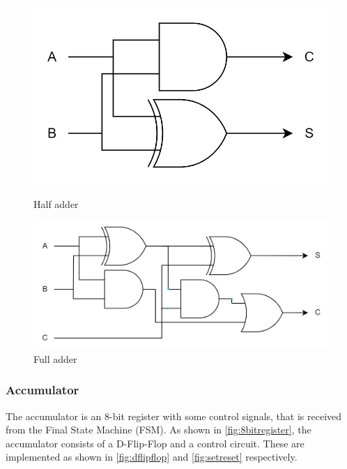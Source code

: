 \begin{figure}[H]
\begin{minipage}{0.4\textwidth}
    \centering
    \includegraphics[width=\linewidth]{Figures/halfadder.png}
    \caption{Half adder}
    \label{fig:halfadder}
\end{minipage}
\begin{minipage}{0.6\textwidth}
    \centering
    \includegraphics[width=\linewidth]{Figures/fulladder.png}
    \caption{Full adder}
    \label{fig:fulladder}
\end{minipage}
\end{figure}


\subsubsection{Accumulator}
\label{subsubsec:accumulator}
The accumulator is an 8-bit register with some control signals, that is received from the Final State Machine (FSM). As shown in \autoref{fig:8bitregister}, the accumulator consists of a D-Flip-Flop and a control circuit. These are implemented as shown in \autoref{fig:dflipflop} and \ref{fig:setreset} respectively.

